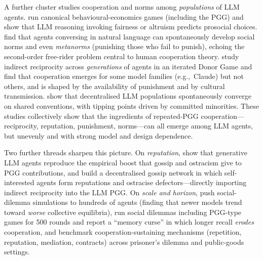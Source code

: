 \documentclass[11pt,a4paper]{article}
\newcommand{\eg}{e.g.,\ }
\begin{document}
A further cluster studies cooperation and norms among \emph{populations} of LLM
agents. \citet{leng2023llmsocial} run canonical behavioural-economics games
(including the PGG) and show that LLM reasoning invoking fairness or altruism
predicts prosocial choices. \citet{horiguchi2024evolution} find that agents
conversing in natural language can spontaneously develop social norms and even
\emph{metanorms} (punishing those who fail to punish), echoing the second-order
free-rider problem central to human cooperation theory.
\citet{vallinder2024cultural} study indirect reciprocity across
\emph{generations} of agents in an iterated Donor Game and find that cooperation
emerges for some model families (\eg Claude) but not others, and is shaped by the
availability of punishment and by cultural transmission. \citet{ashery2025emergent}
show that decentralised LLM populations spontaneously converge on shared
conventions, with tipping points driven by committed minorities. These studies
collectively show that the ingredients of repeated-PGG cooperation---reciprocity,
reputation, punishment, norms---can all emerge among LLM agents, but unevenly and
with strong model and design dependence.

Two further threads sharpen this picture. On \emph{reputation},
\citet{cross2025validating} show that generative LLM agents reproduce the
empirical boost that gossip and ostracism give to PGG contributions, and
\citet{zhu2026gossip} build a decentralised gossip network in which self-interested
agents form reputations and ostracise defectors---directly importing indirect
reciprocity into the LLM PGG. On \emph{scale and horizon},
\citet{willis2026hundreds} push social-dilemma simulations to hundreds of agents
(finding that newer models trend toward \emph{worse} collective equilibria),
\citet{liu2026memory} run social dilemmas including PGG-type games for 500 rounds
and report a ``memory curse'' in which longer recall \emph{erodes} cooperation, and
\citet{tewolde2026coopeval} benchmark cooperation-sustaining mechanisms
(repetition, reputation, mediation, contracts) across prisoner's dilemma and
public-goods settings.
\end{document}
